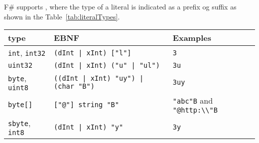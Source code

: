 F\# supports , where the type of a literal is indicated as a prefix og suffix as shown in the Table~\ref{tab:literalTypes}.
\begin{table}
  \centering
  \begin{tabular}{|l|l|l|}
    \hline
    \rowcolor{headerRowColor} type & EBNF & Examples \\
    \hline
    \lstinline!int!, \lstinline!int32! & \lstinline[language=ebnf]!(dInt | xInt) ["l"]!  & \lstinline!3! \\
    \lstinline!uint32! & \lstinline[language=ebnf]!(dInt | xInt) ("u" | "ul")! & \lstinline!3u! \\
    \lstinline!byte!, \lstinline!uint8! & \lstinline[language=ebnf]!((dInt | xInt) "uy") | (char "B")!  & \lstinline!3uy!  \\
    \lstinline!byte[]! & \lstinline[language=ebnf]!["@"] string "B"!  & \lstinline!"abc"B! and \lstinline!"@http:\\"B!  \\
    \lstinline!sbyte!, \lstinline!int8! & \lstinline[language=ebnf]!(dInt | xInt) "y"! & \lstinline!3y!  \\

\end{tabular}
\end{table}
